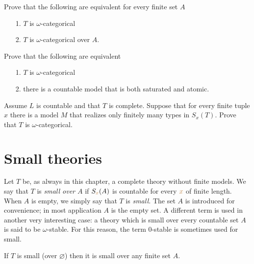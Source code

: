 \begin{exercise}\label{ex_omega_cat_overA}
Prove that the following are equivalent for every finite set $A$
\begin{itemize}   
\item[1.] $T$ is $\omega$-categorical
\item[2.] $T$ is $\omega$-categorical over $A$.
\end{itemize}
\end{exercise}

\begin{exercise}\label{ex_omega_cat_sat=atomic}
Prove that the following are equivalent
\begin{itemize}   
\item[1.] $T$ is $\omega$-categorical
\item[2.] there is a countable model that is both saturated and atomic. 
\end{itemize}
\end{exercise}

\begin{exercise} 
Assume $L$ is countable and that $T$ is complete.
Suppose that for every finite tuple $x$ there is a model $M$ that realizes only finitely many types in $S_x(T)$.
Prove that $T$ is $\omega$-categorical.
\end{exercise}

\section{Small theories}

\def\ceq#1#2#3{\parbox[b]{15ex}{$\displaystyle #1$}\parbox[b]{6ex}{\hfil$#2$}$\displaystyle #3$}

Let $T$ be, as always in this chapter, a complete theory without finite models.
We say that $T$ is \emph{small over $A$\/} if $S_{{\color{brown} x}}(A)$ is countable for every ${\color{brown} x}$ of finite length.
When $A$ is empty, we simply say that $T$ is \emph{small.}
The set $A$ is introduced for convenience; in most application $A$ is the empty set.
A different term is used in another very interesting case: a theory which is small over every countable set $A$ is said to be $\omega$-stable.
For this reason, the term $0$-stable is sometimes used for small.

\begin{proposition}
If $T$ is small (over $\varnothing$) then it is small over any finite set $A$.
\end{proposition}

